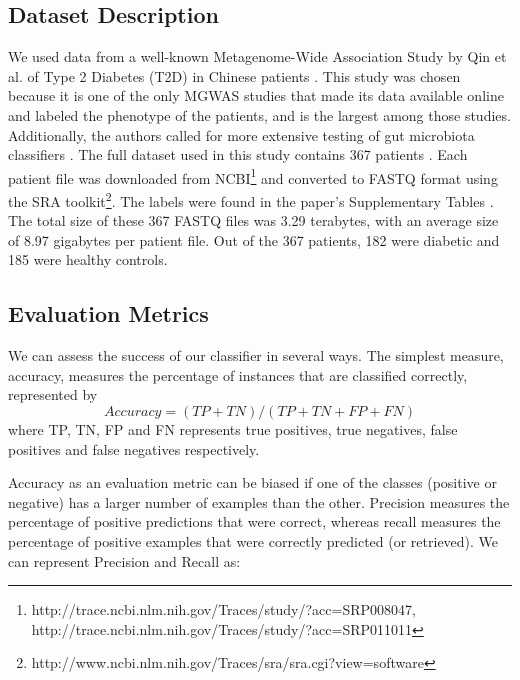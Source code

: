 \subsection{Dataset Description}

We used data from a well-known Metagenome-Wide Association Study by Qin et al. of Type 2 Diabetes (T2D) in Chinese patients \cite{qin041012}. This study was chosen because it is one of the only MGWAS studies that made its data available online and labeled the phenotype of the patients, and is the largest among those studies. Additionally, the authors called for more extensive testing of gut microbiota classifiers \cite{qin041012}. The full dataset used in this study contains 367 patients \cite{qin041012}. Each patient file was downloaded from NCBI\footnote{http://trace.ncbi.nlm.nih.gov/Traces/study/?acc=SRP008047, http://trace.ncbi.nlm.nih.gov/Traces/study/?acc=SRP011011}
and converted to FASTQ format using the SRA toolkit\footnote{http://www.ncbi.nlm.nih.gov/Traces/sra/sra.cgi?view=software}.
The labels were found in the paper's Supplementary Tables \cite{qin041012}. The total size of these 367 FASTQ files was 3.29 terabytes, with an average size of 8.97 gigabytes per patient file. Out of the 367 patients, 182 were diabetic and 185 were healthy controls. 

\subsection{Evaluation Metrics}

We can assess the success of our classifier in several ways. The simplest measure, accuracy, measures the percentage of instances 
that are classified correctly, represented by 
\begin{equation}
Accuracy = (TP + TN)/ (TP + TN + FP + FN)  \label{eqn:acc} 
\end{equation}
where TP, TN, FP and FN represents true positives, true negatives, false positives and false negatives respectively.

Accuracy as an evaluation metric can be biased if one of the classes 
(positive or negative)  has a larger number of examples than the other.   
Precision measures the percentage of positive predictions that 
were correct, 
whereas recall measures the percentage of positive 
examples that were correctly predicted (or retrieved). 
We can represent Precision and Recall as:

